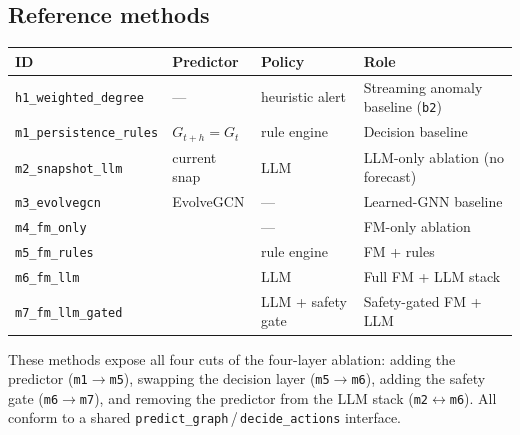 \subsection{Reference methods}
\label{app:reference-methods}
\begin{center}\small
\begin{tabularx}{\linewidth}{@{}lllX@{}}
\toprule
ID                              & Predictor      & Policy                & Role \\
\midrule
\texttt{h1\_weighted\_degree}   & ---            & heuristic alert       & Streaming anomaly baseline (\texttt{b2}) \\
\texttt{m1\_persistence\_rules} & $G_{t+h}\!=\!G_t$ & rule engine        & Decision baseline \\
\texttt{m2\_snapshot\_llm}      & current snap   & LLM                   & LLM-only ablation (no forecast) \\
\texttt{m3\_evolvegcn}          & EvolveGCN      & ---                   & Learned-GNN baseline \\
\texttt{m4\_fm\_only}           & \fmname{}      & ---                   & FM-only ablation \\
\texttt{m5\_fm\_rules}          & \fmname{}      & rule engine           & FM + rules \\
\texttt{m6\_fm\_llm}            & \fmname{}      & LLM                   & Full FM + LLM stack \\
\texttt{m7\_fm\_llm\_gated}     & \fmname{}      & LLM + safety gate     & Safety-gated FM + LLM \\
\bottomrule
\end{tabularx}
\end{center}
These methods expose all four cuts of the four-layer ablation: adding the
predictor (\texttt{m1}$\!\to\!$\texttt{m5}), swapping the decision layer
(\texttt{m5}$\!\to\!$\texttt{m6}), adding the safety gate
(\texttt{m6}$\!\to\!$\texttt{m7}), and removing the predictor from the LLM
stack (\texttt{m2}$\!\leftrightarrow\!$\texttt{m6}). All conform to a
shared \texttt{predict\_graph}\,/\,\texttt{decide\_actions} interface.

